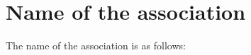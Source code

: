 \section{Name of the association}
\label{rule:name}

The name of the association is as follows:\\
\textbf{\orgName{}}
